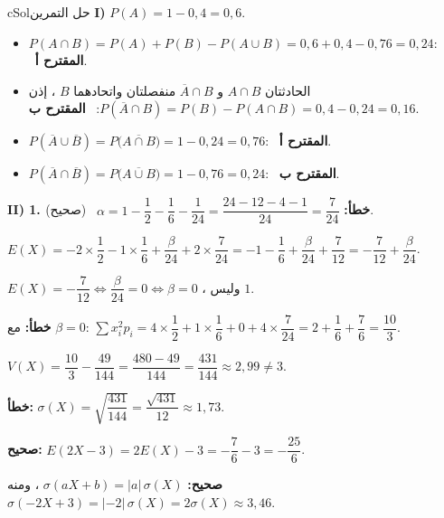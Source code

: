 \documentclass[12pt,a4paper]{article}
\newcounter{exo}
\newenvironment{hal}{\Needspace{12\baselineskip}\begin{otherlanguage}{english}\begin{arbox}[breakable]{cSol}{حل التمرين \theexo}}{\end{arbox}\end{otherlanguage}}
\begin{document}
\begin{hal}
\textbf{I)} $P(A)=1-0{,}4=0{,}6$.
\begin{itemize}
\item $P(A\cap B)=P(A)+P(B)-P(A\cup B)=0{,}6+0{,}4-0{,}76=0{,}24$: \ \textbf{المقترح أ}.
\item الحادثتان $A\cap B$ و $\overline A\cap B$ منفصلتان واتحادهما $B$ ، إذن $P(\overline A\cap B)=P(B)-P(A\cap B)=0{,}4-0{,}24=0{,}16$: \ \textbf{المقترح ب}.
\item $P(\overline A\cup\overline B)=P\big(\overline{A\cap B}\big)=1-0{,}24=0{,}76$: \ \textbf{المقترح أ}.
\item $P(\overline A\cap\overline B)=P\big(\overline{A\cup B}\big)=1-0{,}76=0{,}24$: \ \textbf{المقترح ب}.
\end{itemize}

\textbf{II) 1. خطأ:} $\alpha=1-\dfrac12-\dfrac16-\dfrac1{24}=\dfrac{24-12-4-1}{24}=\dfrac{7}{24}$ \ (صحيح).\par
$E(X)=-2\times\dfrac12-1\times\dfrac16+\dfrac{\beta}{24}+2\times\dfrac{7}{24}=-1-\dfrac16+\dfrac{\beta}{24}+\dfrac{7}{12}=-\dfrac{7}{12}+\dfrac{\beta}{24}$.\par
$E(X)=-\dfrac7{12}\iff\dfrac{\beta}{24}=0\iff\beta=0$ ، وليس $1$.

 \textbf{خطأ:} مع $\beta=0$: $\sum x_i^2p_i=4\times\dfrac12+1\times\dfrac16+0+4\times\dfrac{7}{24}=2+\dfrac16+\dfrac76=\dfrac{10}{3}$.\par
$V(X)=\dfrac{10}{3}-\dfrac{49}{144}=\dfrac{480-49}{144}=\dfrac{431}{144}\approx2{,}99\ne3$.

 \textbf{خطأ:} $\sigma(X)=\sqrt{\dfrac{431}{144}}=\dfrac{\sqrt{431}}{12}\approx1{,}73$.

 \textbf{صحيح:} $E(2X-3)=2E(X)-3=-\dfrac{7}{6}-3=-\dfrac{25}{6}$.

 \textbf{صحيح:} $\sigma(aX+b)=|a|\,\sigma(X)$ ، ومنه $\sigma(-2X+3)=|-2|\,\sigma(X)=2\sigma(X)\approx3{,}46$.
\end{hal}

\end{document}
